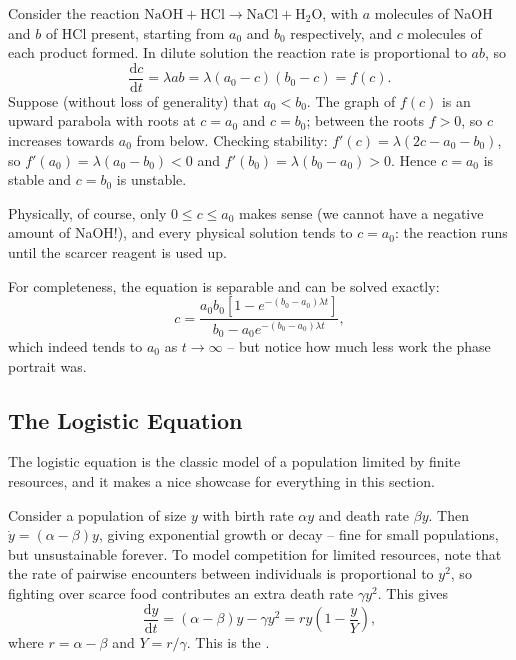 \begin{example}
	Consider the reaction $\mathrm{NaOH} + \mathrm{HCl} \to \mathrm{NaCl} + \mathrm{H_2O}$, with $a$ molecules of NaOH and $b$ of HCl present, starting from $a_0$ and $b_0$ respectively, and $c$ molecules of each product formed. In dilute solution the reaction rate is proportional to $ab$, so
	$$
	\frac{\mathrm{d}c}{\mathrm{d}t} = \lambda a b = \lambda (a_0 - c)(b_0 - c) = f(c).
	$$
	Suppose (without loss of generality) that $a_0 < b_0$. The graph of $f(c)$ is an upward parabola with roots at $c = a_0$ and $c = b_0$; between the roots $f > 0$, so $c$ increases towards $a_0$ from below. Checking stability: $f'(c) = \lambda(2c - a_0 - b_0)$, so $f'(a_0) = \lambda (a_0 - b_0) < 0$ and $f'(b_0) = \lambda(b_0 - a_0) > 0$. Hence $c = a_0$ is stable and $c = b_0$ is unstable.

	\begin{center}
	\end{center}

	Physically, of course, only $0 \leq c \leq a_0$ makes sense (we cannot have a negative amount of NaOH!), and every physical solution tends to $c = a_0$: the reaction runs until the scarcer reagent is used up.

	For completeness, the equation is separable and can be solved exactly:
	$$
	c = \frac{a_0 b_0 \left[1 - e^{-(b_0 - a_0)\lambda t}\right]}{b_0 - a_0 e^{-(b_0 - a_0)\lambda t}},
	$$
	which indeed tends to $a_0$ as $t \to \infty$ -- but notice how much less work the phase portrait was.
\end{example}

\subsection{The Logistic Equation}

The logistic equation is the classic model of a population limited by finite resources, and it makes a nice showcase for everything in this section.

Consider a population of size $y$ with birth rate $\alpha y$ and death rate $\beta y$. Then $\dot y = (\alpha - \beta) y$, giving exponential growth or decay -- fine for small populations, but unsustainable forever. To model competition for limited resources, note that the rate of pairwise encounters between individuals is proportional to $y^2$, so fighting over scarce food contributes an extra death rate $\gamma y^2$. This gives
$$
\frac{\mathrm{d}y}{\mathrm{d}t} = (\alpha - \beta) y - \gamma y^2 = r y \left(1 - \frac{y}{Y}\right),
$$
where $r = \alpha - \beta$ and $Y = r/\gamma$. This is the .

